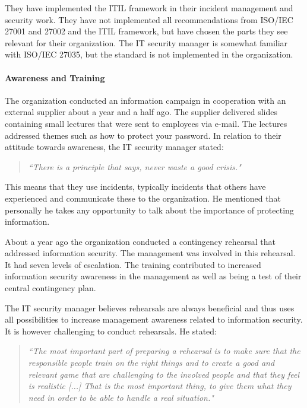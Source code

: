 They have implemented the \ac{ITIL} framework in their incident management and security work. They have not implemented all recommendations from \acs{ISO}/\acs{IEC} 27001 and 27002 and the \ac{ITIL} framework, but have chosen the parts they see relevant for their organization. The IT security manager is somewhat familiar with \acs{ISO}/\acs{IEC} 27035, but the standard is not implemented in the organization.

\paragraph{Awareness and Training}
The organization conducted an information campaign in cooperation with an external supplier about a year and a half ago. The supplier delivered slides containing small lectures that were sent to employees via e-mail. The lectures addressed themes such as how to protect your password. In relation to their attitude towards awareness, the IT security manager stated: 

\begin{quote}
\textit{``There is a principle that says, never waste a good crisis."}
\end{quote}

This means that they use incidents, typically incidents that others have experienced and communicate these to the organization. He mentioned that personally he takes any opportunity to talk about the importance of protecting information.

About a year ago the organization conducted a contingency rehearsal that addressed information security. The management was involved in this rehearsal. It had seven levels of escalation. The training contributed to increased information security awareness in the management as well as being a test of their central contingency plan.

The IT security manager believes rehearsals are always beneficial and thus uses all possibilities to increase management awareness related to information security. It is however challenging to conduct rehearsals. He stated:

\begin{quote}
\textit{``The most important part of preparing a rehearsal is to make sure that the responsible people train on the right things and to create a good and relevant game that are challenging to the involved people and that they feel is realistic [...] That is the most important thing, to give them what they need in order to be able to handle a real situation."}
\end{quote}


